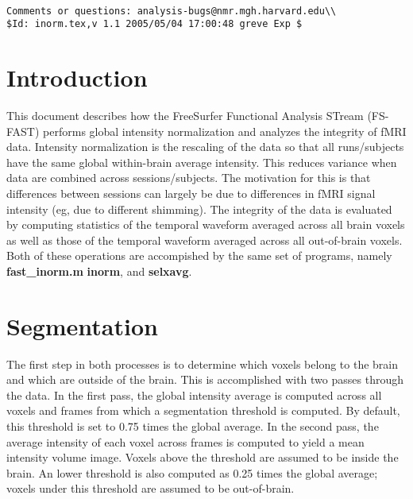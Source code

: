 \documentclass[10pt]{article}
\begin{document}
\begin{center}
\begin{Large}
 \\
\end{Large}
\end{center}

\noindent 
\begin{verbatim}
Comments or questions: analysis-bugs@nmr.mgh.harvard.edu\\
$Id: inorm.tex,v 1.1 2005/05/04 17:00:48 greve Exp $
\end{verbatim}

\section{Introduction}
This document describes how the FreeSurfer Functional Analysis STream
(FS-FAST) performs global intensity normalization and analyzes the
integrity of fMRI data. Intensity normalization is the rescaling of
the data so that all runs/subjects have the same global within-brain
average intensity.  This reduces variance when data are combined
across sessions/subjects.  The motivation for this is that differences
between sessions can largely be due to differences in fMRI signal
intensity (eg, due to different shimming). The integrity of the data
is evaluated by computing statistics of the temporal waveform averaged
across all brain voxels as well as those of the temporal waveform averaged
across all out-of-brain voxels.  Both of these operations are
accompished by the same set of programs, namely {\bf fast\_inorm.m}
{\bf inorm}, and {\bf selxavg}.

\section{Segmentation}

The first step in both processes is to determine which voxels belong
to the brain and which are outside of the brain.  This is accomplished
with two passes through the data. In the first pass, the global
intensity average is computed across all voxels and frames from which
a segmentation threshold is computed. By default, this threshold is
set to 0.75 times the global average.  In the second pass, the average
intensity of each voxel across frames is computed to yield a mean
intensity volume image. Voxels above the threshold are assumed to be
inside the brain.  An lower threshold is also computed as 0.25
times the global average;  voxels under this threshold are assumed to be
out-of-brain.
\end{document}
